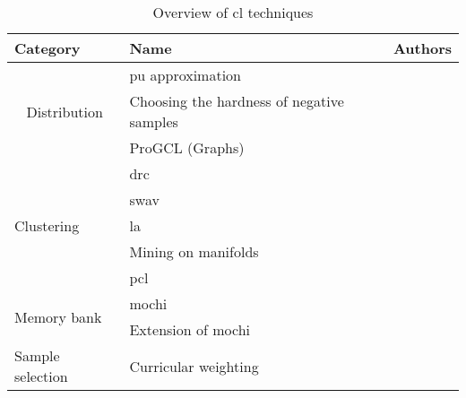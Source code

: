 \documentclass[runningheads]{llncs}
\begin{document}
\begin{table}[]
    \caption{Overview of \acs{cl} techniques}
    \label{tab:overview}
    \begin{tabular}{|l|l|l|}
    \hline
    \textbf{Category}                                   & \textbf{Name}                             & \textbf{Authors} \\ \hline
    \multicolumn{1}{|c|}{\multirow{3}{*}{Distribution}} & \acs{pu} approximation                          & \citet{chuang_debiased_2020}                \\ \cline{2-3} 
    \multicolumn{1}{|c|}{}                              & Choosing the hardness of negative samples     & \citet{robinson_contrastive_2021}                \\ \cline{2-3} 
    \multicolumn{1}{|c|}{}                              & ProGCL (Graphs)                               & \citet{progcl_2022}                \\ \hline
    \multirow{5}{*}{Clustering}                         & \acs{drc}                                       & \citet{DRC_2020}                \\ \cline{2-3} 
                                                        & \acs{swav}                                      & \citet{swav_2020}                \\ \cline{2-3} 
                                                        & \acs{la}                                       & \citet{local_aggr_2019}                \\ \cline{2-3} 
                                                        & Mining on manifolds                           & \citet{mining_manifolds_2018}                \\ \cline{2-3} 
                                                        & \ac{pcl}                                      & \citet{PCL_2021}               \\ \hline
    \multirow{2}{*}{Memory bank}                             & \acs{mochi}                                     & \citet{mochi_2020}                \\ \cline{2-3} 
                                                        & Extension of \acs{mochi}                        & \citet{progcl_2022}                \\ \hline
    Sample selection                                              & Curricular weighting                          & \citet{curricular_weighting_2024}               \\ \hline
    \end{tabular}
    \end{table}
\end{document}
